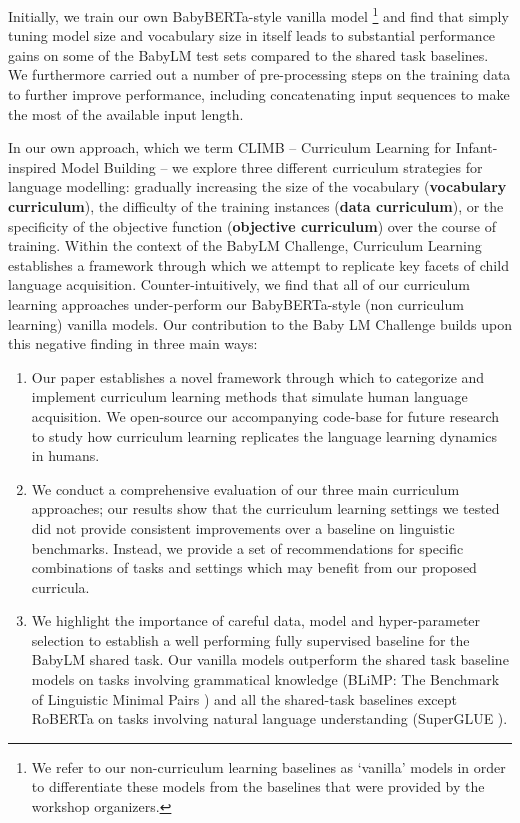Initially, we train our own BabyBERTa-style vanilla model \footnote{We refer to our non-curriculum learning baselines as `vanilla' models in order to differentiate these models from the baselines that were provided by the workshop organizers.} \cite{huebner2021babyberta} and find that simply tuning model size and vocabulary size in itself leads to substantial performance gains on some of the BabyLM test sets compared to the shared task baselines.
We furthermore carried out a number of pre-processing steps on the training data to further improve performance, including concatenating input sequences to make the most of the available input length.

In our own approach, which we term CLIMB  -- Curriculum Learning for Infant-inspired Model Building -- we explore three different curriculum strategies for language modelling: gradually increasing the size of the vocabulary (\textbf{vocabulary curriculum}), the difficulty of the training instances (\textbf{data curriculum}), or the specificity of the objective function (\textbf{objective curriculum}) over the course of training. Within the context of the BabyLM Challenge, Curriculum Learning establishes a framework through which we attempt to replicate key facets of child language acquisition. Counter-intuitively, we find that all of our curriculum learning approaches under-perform our BabyBERTa-style (non curriculum learning) vanilla models. Our contribution to the Baby LM Challenge builds upon this negative finding in three main ways:
\begin{enumerate}
    \item Our paper establishes a novel framework through which to categorize and implement curriculum learning methods that simulate human language acquisition. We open-source our accompanying code-base for future research to study how curriculum learning replicates the language learning dynamics in humans. 
    \item We conduct a comprehensive evaluation of our three main curriculum approaches; our results show that the curriculum learning settings we tested did not provide consistent improvements over a baseline on linguistic benchmarks. Instead, we provide a set of recommendations for specific combinations of tasks and settings which may benefit from our proposed curricula. 
    \item We highlight the importance of careful data, model and hyper-parameter selection to establish a well performing fully supervised baseline for the BabyLM shared task. Our vanilla models outperform the shared task baseline models on tasks involving grammatical knowledge (BLiMP: The Benchmark of Linguistic Minimal Pairs \cite{warstadt2020blimp}) and all the shared-task baselines except RoBERTa \cite{liu2019roberta} on tasks involving natural language understanding (SuperGLUE \cite{wang2019superglue}).
\end{enumerate}



